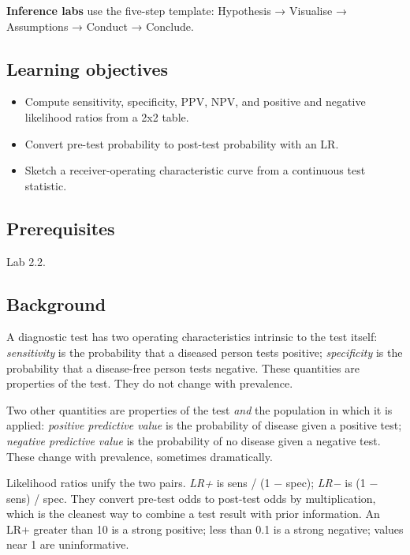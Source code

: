 \documentclass[
]{article}
\author{}
\date{\vspace{-2.5em}}
\providecommand{\tightlist}{%
  \setlength{\itemsep}{0pt}\setlength{\parskip}{0pt}}
\begin{document}
\textbf{Inference labs} use the five-step template: Hypothesis →
Visualise → Assumptions → Conduct → Conclude.

\subsection{Learning objectives}\label{learning-objectives}

\begin{itemize}
\tightlist
\item
  Compute sensitivity, specificity, PPV, NPV, and positive and negative
  likelihood ratios from a 2x2 table.
\item
  Convert pre-test probability to post-test probability with an LR.
\item
  Sketch a receiver-operating characteristic curve from a continuous
  test statistic.
\end{itemize}

\subsection{Prerequisites}\label{prerequisites}

Lab 2.2.

\subsection{Background}\label{background}

A diagnostic test has two operating characteristics intrinsic to the
test itself: \emph{sensitivity} is the probability that a diseased
person tests positive; \emph{specificity} is the probability that a
disease-free person tests negative. These quantities are properties of
the test. They do not change with prevalence.

Two other quantities are properties of the test \emph{and} the
population in which it is applied: \emph{positive predictive value} is
the probability of disease given a positive test; \emph{negative
predictive value} is the probability of no disease given a negative
test. These change with prevalence, sometimes dramatically.

Likelihood ratios unify the two pairs. \emph{LR+} is sens / (1 − spec);
\emph{LR−} is (1 − sens) / spec. They convert pre-test odds to post-test
odds by multiplication, which is the cleanest way to combine a test
result with prior information. An LR+ greater than 10 is a strong
positive; less than 0.1 is a strong negative; values near 1 are
uninformative.
\end{document}
